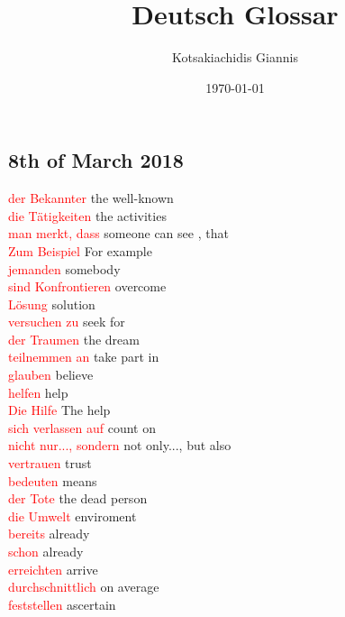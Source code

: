 \documentclass{article}
\title{\textbf{Deutsch Glossar}}
\author{Kotsakiachidis Giannis }
\date{\today }
\begin{document}
	\maketitle
	
	\clearpage
	
	\tableofcontents
	

	
	\begin{multicols}{2}
	
	\section*{8th of March 2018}
	\textcolor{red}{der Bekannter} the well-known\\
	\textcolor{red}{die Tätigkeiten} the activities\\
	\textcolor{red}{man merkt, dass} someone can see , that\\
	\textcolor{red}{Zum Beispiel} For example\\
	\textcolor{red}{jemanden} somebody\\
	\textcolor{red}{sind Konfrontieren} overcome\\
	\textcolor{red}{Lösung} solution\\
	\textcolor{red}{versuchen zu} seek for\\
	\textcolor{red}{der Traumen} the dream\\
	\textcolor{red}{teilnemmen an} take part in\\
	\textcolor{red}{glauben} believe\\
	\textcolor{red}{helfen} help\\
	\textcolor{red}{Die Hilfe} The help\\
	\textcolor{red}{sich verlassen auf} count on\\
	\textcolor{red}{nicht nur..., sondern} not only..., but also\\
	\textcolor{red}{vertrauen} trust\\
	\textcolor{red}{bedeuten} means\\
	\textcolor{red}{der Tote} the dead person\\
	\textcolor{red}{die Umwelt} enviroment\\
	\textcolor{red}{bereits} already\\
	\textcolor{red}{schon} already\\
	\textcolor{red}{erreichten} arrive\\
	\textcolor{red}{durchschnittlich} on average\\
	\textcolor{red}{feststellen} ascertain\\

\end{multicols}
\end{document}
